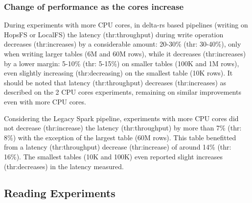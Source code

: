 \subsubsection*{Change of performance as the  cores increase}

During experiments with more \gls{CPU} cores, in delta-rs based pipelines (writing on \gls{HopsFS} or \gls{LocalFS}) the latency (thr:throughput) during write operation decreases (thr:increases) by a considerable amount: 20-30\% (thr: 30-40\%), only when writing larger tables (6M and 60M rows), while it decreases (thr:increases) by a lower margin: 5-10\% (thr: 5-15\%) on smaller tables (100K and 1M rows), even slightly increasing (thr:decreasing) on the smallest table (10K rows). It should be noted that latency (thr:throughput) decreases (thr:increases) as described on the 2 \gls{CPU} cores experiments, remaining on similar improvements even with more \gls{CPU} cores.

Considering the Legacy Spark pipeline, experiments with more \gls{CPU} cores did not decrease (thr:increase) the latency (thr:throughput) by more than 7\% (thr: 8\%) with the exception of the largest table (60M rows). This table benefitted from a latency (thr:throughput) decrease (thr:increase) of around 14\% (thr: 16\%). The smallest tables (10K and 100K) even reported slight increases (thr:decreases) in the latency measured.

\subsection{Reading Experiments}

